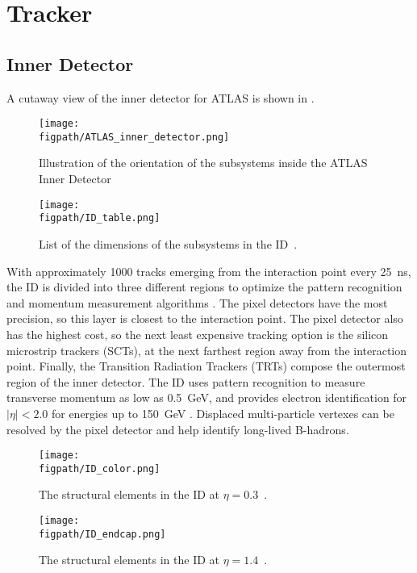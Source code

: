 \clearpage

\section{Tracker}

\subsection{Inner Detector}
\label{inner_detector}

A cutaway view of the inner detector for ATLAS is shown in .
\begin{figure}[h!tbp]
\centering
\texttt{[image: \\figpath/ATLAS\_inner\_detector.png]}
\caption{Illustration of the orientation of the subsystems inside the ATLAS Inner Detector~\cite{Aad:2008Jinst}}
\label{ATLAS-InnerDetector}
\end{figure}

\begin{figure}[h!tbp]
\centering
\texttt{[image: \\figpath/ID\_table.png]}
\caption{List of the dimensions of the subsystems in the ID~\cite{ATLAS_long}.}
\label{ID-table}
\end{figure}
With approximately 1000 tracks emerging from the interaction point every 25~ns, the ID is divided into three different regions to optimize the pattern recognition and momentum measurement algorithms \cite{ATLAS_long}.  
The pixel detectors have the most precision, so this layer is closest to the interaction point. The pixel detector also has the highest cost, so the next least expensive tracking option is the silicon microstrip trackers (SCTs), at the next farthest region away from the interaction point.  Finally, the Transition Radiation Trackers (TRTs) compose the outermost region of the inner detector.
The ID uses pattern recognition to measure transverse momentum as low as 0.5~GeV, and provides electron identification for $|\eta| < 2.0$ for energies up to 150~GeV \cite{ATLAS_long}. Displaced multi-particle vertexes can be resolved by the pixel detector and help identify long-lived B-hadrons.

\begin{figure}[h!tbp]
\centering
\texttt{[image: \\figpath/ID\_color.png]}
\caption{The structural elements in the ID at $\eta = 0.3$~\cite{ATLAS_long}.}
\label{ID_color}
\end{figure}

\begin{figure}[h!tbp]
\centering
\texttt{[image: \\figpath/ID\_endcap.png]}
\caption{The structural elements in the ID at $\eta = 1.4$~\cite{ATLAS_long}.}
\label{ID_endcap}
\end{figure}

